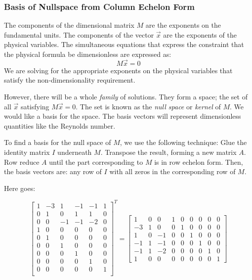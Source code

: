 \documentclass[]{article}
\begin{document}
\subsubsection*{Basis of Nullspace from Column Echelon Form}

The components of the dimensional matrix $M$ are the exponents on the fundamental units.  The components of the vector $\vec{x}$ are the exponents of the physical variables.  The simultaneous equations that express the constraint that the physical formula be dimensionless are expressed as:
\[ M \vec{x} = 0 \]
We are solving for the appropriate exponents on the physical variables that satisfy the non-dimensionality requirement.

However, there will be a whole \emph{family} of solutions. They form a space; the set of all $\vec{x}$ satisfying $M\vec{x}= 0$.  The set is known as the \emph{null space} or \emph{kernel} of $M$.  We would like a basis for the space.  The basis vectors will represent dimensionless quantities like the Reynolds number.

To find a basis for the null space of $M$, we use the following technique:
Glue the identity matrix $I$ underneath $M$.  Transpose the result, forming a new matrix $A$.  Row reduce $A$ until the part corresponding to $M$ is in row echelon form.  Then, the basis vectors are: any row of $I$ with all zeros in the corresponding row of $M$.

Here goes:

\[ 
\begin{bmatrix}
1  & -3  &  1  & -1  & -1  &  1  \\
0  &  1  &  0  &  1  &  1  &  0  \\
0  &  0  & -1  & -1  & -2  &  0 \\
\hline
1  &  0  &  0  &  0  &  0  &  0 \\ 
0  &  1  &  0  &  0  &  0  &  0 \\ 
0  &  0  &  1  &  0  &  0  &  0 \\ 
0  &  0  &  0  &  1  &  0  &  0 \\ 
0  &  0  &  0  &  0  &  1  &  0 \\ 
0  &  0  &  0  &  0  &  0  &  1 \\ 
\end{bmatrix}^T
=
\begin{bmatrix}
1  &  0  &  0  &  1  &  0  &  0  &  0  &  0  &  0 \\
-3 &  1  &  0  &  0  &  1  &  0  &  0  &  0  &  0 \\
1  &  0  & -1  &  0  &  0  &  1  &  0  &  0  &  0 \\
-1 &  1  & -1  &  0  &  0  &  0  &  1  &  0  &  0 \\
-1 &  1  & -2  &  0  &  0  &  0  &  0  &  1  &  0 \\
1  &  0  &  0  &  0  &  0  &  0  &  0  &  0  &  1
\end{bmatrix}
\]
\end{document}
